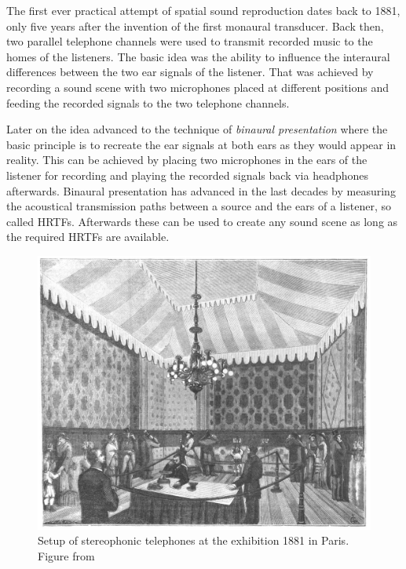 The first ever practical attempt of spatial sound reproduction dates back to
1881, only five years after the invention of the first monaural transducer.
Back then, two parallel telephone channels were used to transmit recorded
music to the homes of the listeners.\autocite{DuMoncel1881a}
The basic idea was the ability to influence the interaural
differences between the two ear signals of the listener. That was achieved by
recording a sound scene with two microphones placed at different positions 
and feeding the recorded signals to the two telephone channels.

Later on the idea advanced to the technique of \emph{binaural presentation} where the basic
principle is to recreate the ear signals at both ears as they would appear in reality.
This can
be achieved by placing two microphones in the ears of the listener for recording and playing the
recorded signals back via headphones afterwards.
Binaural presentation has advanced in the last decades by measuring the
acoustical transmission paths between a source and the ears of a listener, so called
\acp{HRTF}. Afterwards these can be used to create any sound scene as long as
the required \acp{HRTF} are available.
%
\begin{figure}[t]
    \centering
    \includegraphics[width=.8\columnwidth]{fig1_01/stereo_telephone}
    \caption{Setup of stereophonic telephones at the exhibition 1881 in
    Paris. Figure from \cite{DuMoncel1881a}
    }
    \label{fig:stereo_telephone}
\end{figure}

